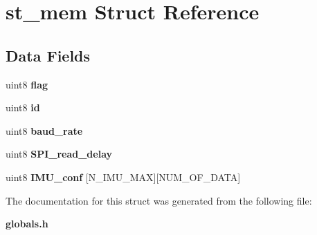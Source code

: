 \section{st\+\_\+mem Struct Reference}
\label{structst__mem}
\subsection*{Data Fields}
\begin{DoxyCompactItemize}
\item 
\mbox{\label{structst__mem_af11e40d15a1361229a78e772af5b3c94}} 
uint8 {\bfseries flag}
\item 
\mbox{\label{structst__mem_a492bfda30c3852a68b2cbfba9531e3d1}} 
uint8 {\bfseries id}
\item 
\mbox{\label{structst__mem_a1a2b3002580421effeca67955a862580}} 
uint8 {\bfseries baud\+\_\+rate}
\item 
\mbox{\label{structst__mem_aa5b15dee0878926cf86de9d3a70d3b30}} 
uint8 {\bfseries S\+P\+I\+\_\+read\+\_\+delay}
\item 
\mbox{\label{structst__mem_a14af68f87b94c84ebf2d503396b4aa47}} 
uint8 {\bfseries I\+M\+U\+\_\+conf} [N\+\_\+\+I\+M\+U\+\_\+\+M\+AX][N\+U\+M\+\_\+\+O\+F\+\_\+\+D\+A\+TA]
\end{DoxyCompactItemize}


The documentation for this struct was generated from the following file\+:\begin{DoxyCompactItemize}
\item 
\textbf{ globals.\+h}\end{DoxyCompactItemize}
